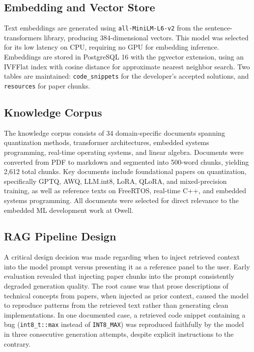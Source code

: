 \documentclass[11pt,twocolumn]{article}
\begin{document}
\subsection{Embedding and Vector Store}

Text embeddings are generated using \texttt{all-MiniLM-L6-v2} from the
sentence-transformers library, producing 384-dimensional vectors. This model
was selected for its low latency on CPU, requiring no GPU for embedding
inference. Embeddings are stored in PostgreSQL 16 with the pgvector extension,
using an IVFFlat index with cosine distance for approximate nearest neighbor
search. Two tables are maintained: \texttt{code\_snippets} for the developer's
accepted solutions, and \texttt{resources} for paper chunks.

\subsection{Knowledge Corpus}

The knowledge corpus consists of 34 domain-specific documents spanning
quantization methods, transformer architectures, embedded systems programming,
real-time operating systems, and linear algebra. Documents were converted from
PDF to markdown and segmented into 500-word chunks, yielding 2,612 total
chunks. Key documents include foundational papers on quantization,
specifically GPTQ, AWQ, LLM.int8, LoRA, QLoRA, and mixed-precision training,
as well as reference texts on FreeRTOS, real-time C++, and embedded systems
programming. All documents were selected for direct relevance to the embedded
ML development work at Owell.

\subsection{RAG Pipeline Design}

A critical design decision was made regarding when to inject retrieved context
into the model prompt versus presenting it as a reference panel to the user.
Early evaluation revealed that injecting paper chunks into the prompt
consistently degraded generation quality. The root cause was that prose
descriptions of technical concepts from papers, when injected as prior context,
caused the model to reproduce patterns from the retrieved text rather than
generating clean implementations. In one documented case, a retrieved code
snippet containing a bug (\texttt{int8\_t::max} instead of \texttt{INT8\_MAX})
was reproduced faithfully by the model in three consecutive generation attempts,
despite explicit instructions to the contrary.
\end{document}
